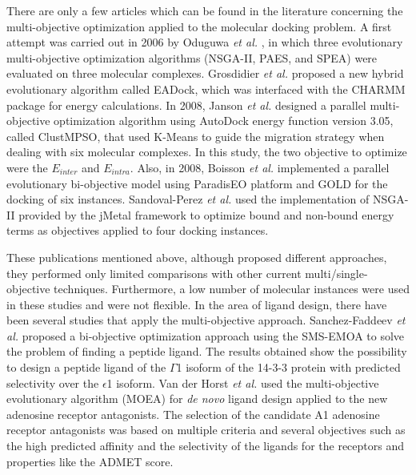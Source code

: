There are only a few articles which can be found in the literature concerning the multi-objective optimization applied to the molecular docking problem. A first attempt was carried out in 2006 by Oduguwa \emph{et al.} \cite{Oduguwa2006}, in which three evolutionary multi-objective optimization algorithms (NSGA-II, PAES, and SPEA) were evaluated on three molecular complexes. Grosdidier \emph{et al.} \cite{Grosdidier2007} proposed a new hybrid evolutionary algorithm called EADock, which was interfaced with the CHARMM package for energy calculations. In 2008, Janson \emph{et al.} \cite{Janson2008} designed a parallel multi-objective optimization algorithm using AutoDock energy function version 3.05, called ClustMPSO, that used K-Means to guide the migration strategy when dealing with six molecular complexes. In this study, the two objective to optimize were the $E_{inter}$ and $E_{intra}$. Also, in 2008, Boisson \emph{et al.} \cite{Boisson2008} implemented a parallel evolutionary bi-objective model using ParadisEO platform and GOLD for the docking of six instances. Sandoval-Perez \emph{et al.} \cite{SandovalPerez2013} used the implementation of NSGA-II provided by the jMetal framework \cite{Durillo2011} to optimize bound and non-bound energy terms as objectives applied to four docking instances.

These publications mentioned above, although proposed different approaches, they performed only limited comparisons with other current multi/single-objective techniques. Furthermore, a low number of molecular instances were used in these studies and were not flexible. In the area of ligand design, there have been several studies that apply the multi-objective approach. Sanchez-Faddeev \emph{et al.} \cite{Sanchez2013} proposed a bi-objective optimization approach using the SMS-EMOA to solve the problem of finding a peptide ligand. The results obtained show the possibility to design a peptide ligand of the $\Gamma$1 isoform of the 14-3-3 protein with predicted selectivity over the $\epsilon$1 isoform. Van der Horst \emph{et al.} \cite{Horst2012} used the multi-objective evolutionary algorithm (MOEA) for \emph{de novo} ligand design applied to the new adenosine receptor antagonists. The selection of the candidate A1 adenosine receptor antagonists was based on multiple criteria and several objectives such as the high predicted affinity and the selectivity of the ligands for the receptors and properties like the ADMET score. 







